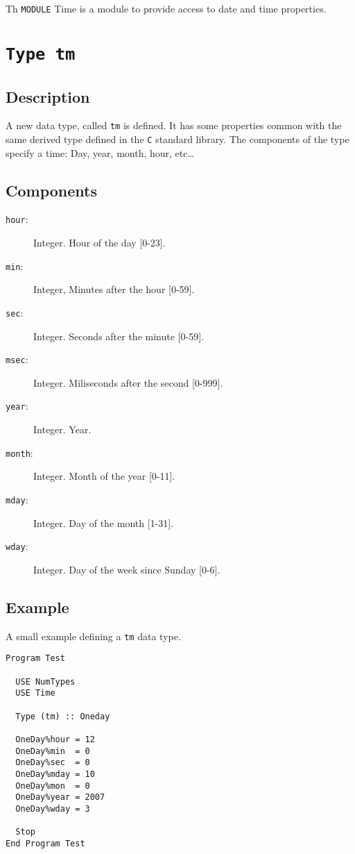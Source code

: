 Th \texttt{MODULE} Time is a module to provide access to date and
time properties.

\section{\texttt{Type tm}}

\subsection{Description}

A new data type, called \texttt{tm} is defined. It has some properties
common with the same derived type defined in the \texttt{C} standard
library. The components of the type specify a time: Day, year, month,
hour, etc\dots

\subsection{Components}

\begin{description}
\item[\texttt{hour}: ] Integer. Hour of the day [0-23].
\item[\texttt{min}: ] Integer, Minutes after the hour [0-59].
\item[\texttt{sec}: ] Integer. Seconds after the minute [0-59].
\item[\texttt{msec}: ] Integer. Miliseconds after the second [0-999].
\item[\texttt{year}: ] Integer. Year.
\item[\texttt{month}: ] Integer. Month of the year [0-11].
\item[\texttt{mday}: ] Integer. Day of the month [1-31].
\item[\texttt{wday}: ] Integer. Day of the week since Sunday [0-6].
\end{description}

\subsection{Example}

A small example defining a \texttt{tm} data type.

\begin{lstlisting}[emph=Type,
                   emphstyle=\color{blue},
                   frame=trBL,
                   caption=Defining a Time data type.,
                   label=typetm]
Program Test

  USE NumTypes
  USE Time

  Type (tm) :: Oneday

  OneDay%hour = 12
  OneDay%min  = 0
  OneDay%sec  = 0
  OneDay%mday = 10
  OneDay%mon  = 0
  OneDay%year = 2007
  OneDay%wday = 3

  Stop
End Program Test
\end{lstlisting}

